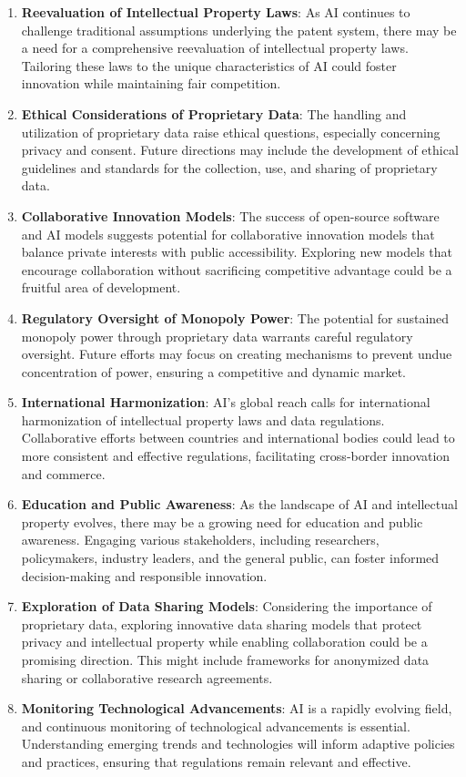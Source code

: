 \documentclass{article}[10pt]
\begin{document}
\begin{enumerate}
	\item \textbf{Reevaluation of Intellectual Property Laws}: As AI continues to challenge traditional assumptions underlying the patent system, there may be a need for a comprehensive reevaluation of intellectual property laws. Tailoring these laws to the unique characteristics of AI could foster innovation while maintaining fair competition.
	\item \textbf{Ethical Considerations of Proprietary Data}: The handling and utilization of proprietary data raise ethical questions, especially concerning privacy and consent. Future directions may include the development of ethical guidelines and standards for the collection, use, and sharing of proprietary data.
	\item \textbf{Collaborative Innovation Models}: The success of open-source software and AI models suggests potential for collaborative innovation models that balance private interests with public accessibility. Exploring new models that encourage collaboration without sacrificing competitive advantage could be a fruitful area of development.
	\item \textbf{Regulatory Oversight of Monopoly Power}: The potential for sustained monopoly power through proprietary data warrants careful regulatory oversight. Future efforts may focus on creating mechanisms to prevent undue concentration of power, ensuring a competitive and dynamic market.
	\item \textbf{International Harmonization}: AI's global reach calls for international harmonization of intellectual property laws and data regulations. Collaborative efforts between countries and international bodies could lead to more consistent and effective regulations, facilitating cross-border innovation and commerce.
	\item \textbf{Education and Public Awareness}: As the landscape of AI and intellectual property evolves, there may be a growing need for education and public awareness. Engaging various stakeholders, including researchers, policymakers, industry leaders, and the general public, can foster informed decision-making and responsible innovation.
	\item \textbf{Exploration of Data Sharing Models}: Considering the importance of proprietary data, exploring innovative data sharing models that protect privacy and intellectual property while enabling collaboration could be a promising direction. This might include frameworks for anonymized data sharing or collaborative research agreements.
	\item \textbf{Monitoring Technological Advancements}: AI is a rapidly evolving field, and continuous monitoring of technological advancements is essential. Understanding emerging trends and technologies will inform adaptive policies and practices, ensuring that regulations remain relevant and effective.
\end{enumerate}
\end{document}
